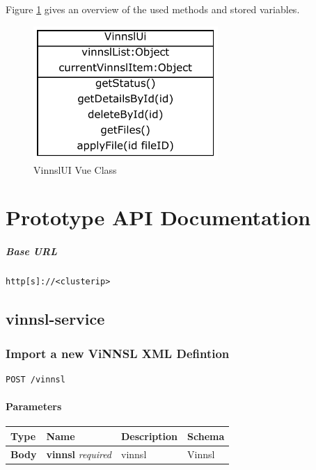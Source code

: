 Figure \ref{vinnsl-nn-ui_class} gives an overview of the used methods
and stored variables.

\begin{figure}
\centering
\includegraphics[width=7.00000cm]{images/vinnsl-nn-ui_class}
\caption{VinnslUI Vue Class \label{vinnsl-nn-ui_class}}
\end{figure}

\chapter{Prototype API Documentation}\label{prototype-api-documentation}

\paragraph{Base URL}\label{base-url}

\begin{verbatim}
http[s]://<clusterip>
\end{verbatim}

\section{vinnsl-service}\label{vinnsl-service-2}

\subsection{Import a new ViNNSL XML
Defintion}\label{import-a-new-vinnsl-xml-defintion}

\begin{verbatim}
POST /vinnsl
\end{verbatim}

\subsubsection{Parameters}\label{parameters}

\begin{longtable}[]{@{}llll@{}}
\toprule
Type & Name & Description & Schema\tabularnewline
\midrule
\endhead
\textbf{Body} & \textbf{vinnsl} \emph{required} & vinnsl &
Vinnsl\tabularnewline
\bottomrule
\end{longtable}

